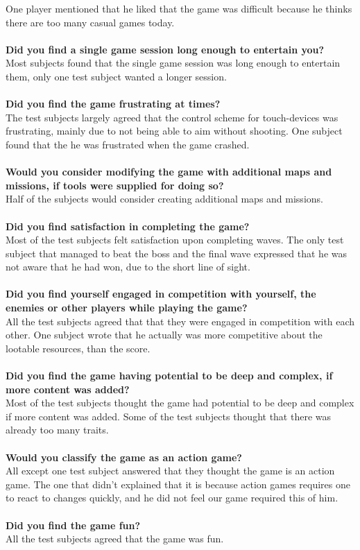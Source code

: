 One player mentioned that he liked that the game was difficult because he thinks there are too many casual games today.\\\\
\textbf{Did you find a single game session long enough to entertain you?}\\
Most subjects found that the single game session was long enough to entertain them, only one test subject wanted a longer session.\\\\
\textbf{Did you find the game frustrating at times?}\\
The test subjects largely agreed that the control scheme for touch-devices was frustrating, mainly due to not being able to aim without shooting.
One subject found that the he was frustrated when the game crashed.\\\\
\textbf{Would you consider modifying the game with additional maps and missions, if tools were supplied for doing so?}\\
Half of the subjects would consider creating additional maps and missions.\\\\
\textbf{Did you find satisfaction in completing the game?}\\
Most of the test subjects felt satisfaction upon completing waves.
The only test subject that managed to beat the boss and the final wave expressed that he was not aware that he had won, due to the short line of sight.\\\\
\textbf{Did you find yourself engaged in competition with yourself, the enemies or other players while playing the game?}\\
All the test subjects agreed that that they were engaged in competition with each other.
One subject wrote that he actually was more competitive about the lootable resources, than the score.\\\\
\textbf{Did you find the game having potential to be deep and complex, if more content was added?}\\
Most of the test subjects thought the game had potential to be deep and complex if more content was added.
Some of the test subjects thought that there was already too many traits.\\\\
\textbf{Would you classify the game as an action game?}\\
All except one test subject answered that they thought the game is an action game.
The one that didn't explained that it is because action games requires one to react to changes quickly, and he did not feel our game required this of him.\\\\
\textbf{Did you find the game fun?}\\
All the test subjects agreed that the game was fun.

